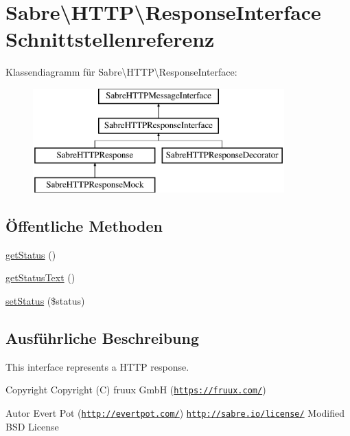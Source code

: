 \hypertarget{interface_sabre_1_1_h_t_t_p_1_1_response_interface}{}\section{Sabre\textbackslash{}H\+T\+TP\textbackslash{}Response\+Interface Schnittstellenreferenz}
\label{interface_sabre_1_1_h_t_t_p_1_1_response_interface}
Klassendiagramm für Sabre\textbackslash{}H\+T\+TP\textbackslash{}Response\+Interface\+:\begin{figure}[H]
\begin{center}
\leavevmode
\includegraphics[height=4.000000cm]{interface_sabre_1_1_h_t_t_p_1_1_response_interface}
\end{center}
\end{figure}
\subsection*{Öffentliche Methoden}
\begin{DoxyCompactItemize}
\item 
\mbox{\hyperlink{interface_sabre_1_1_h_t_t_p_1_1_response_interface_a4424cb29068d23ac01d92fdaf97351c8}{get\+Status}} ()
\item 
\mbox{\hyperlink{interface_sabre_1_1_h_t_t_p_1_1_response_interface_a5fe5d34d36b2fa98e074a463f8368427}{get\+Status\+Text}} ()
\item 
\mbox{\hyperlink{interface_sabre_1_1_h_t_t_p_1_1_response_interface_a918855cfff846d31ac733011952839c8}{set\+Status}} (\$status)
\end{DoxyCompactItemize}


\subsection{Ausführliche Beschreibung}
This interface represents a H\+T\+TP response.

\begin{DoxyCopyright}{Copyright}
Copyright (C) fruux GmbH (\href{https://fruux.com/}{\tt https\+://fruux.\+com/}) 
\end{DoxyCopyright}
\begin{DoxyAuthor}{Autor}
Evert Pot (\href{http://evertpot.com/}{\tt http\+://evertpot.\+com/})  \href{http://sabre.io/license/}{\tt http\+://sabre.\+io/license/} Modified B\+SD License 
\end{DoxyAuthor}


